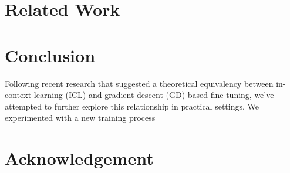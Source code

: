 \documentclass[11pt]{article}
\begin{document}
\section{Related Work}

\section{Conclusion}
Following recent research that suggested a theoretical equivalency between in-context learning (ICL) and gradient descent (GD)-based fine-tuning, we've attempted to further explore this relationship in practical settings.
We experimented with a new training process 
\section{Acknowledgement}





\newpage
\appendix
\end{document}
